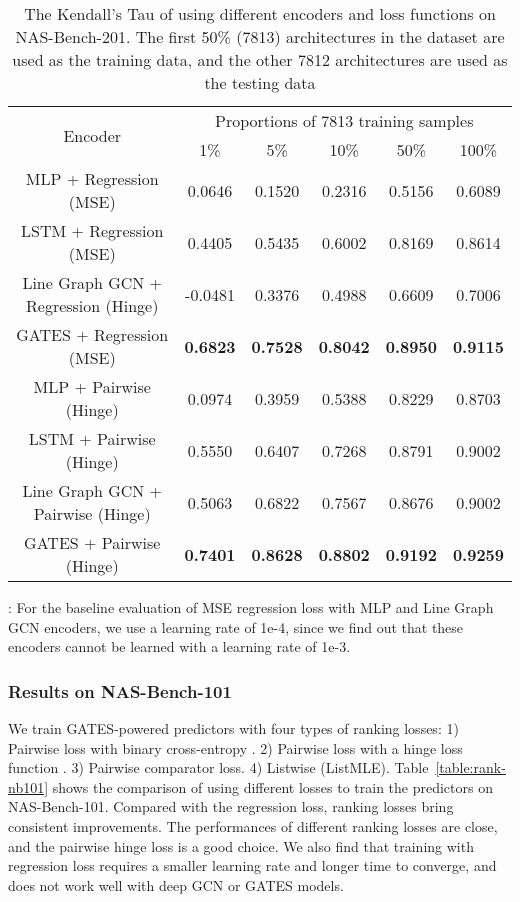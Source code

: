 \documentclass[runningheads]{llncs}
\begin{document}
\addtolength{\tabcolsep}{1pt}
\begin{table*}[tb]
\caption{The Kendall’s Tau of using different encoders and loss functions on NAS-Bench-201. The first 50\% (7813) architectures in the dataset are used as the training data, and the other 7812 architectures are used as the testing data}
\label{table:gates-nb201}
\begin{center}

\begin{tabular}{cccccc}
\toprule
\multirow{2}{*}{Encoder} & \multicolumn{5}{c}{Proportions of 7813 training samples}\\ 
\cmidrule(lr){2-6} & 1\% & 5\% & 10\% & 50\% & 100\% \\\midrule
MLP + Regression (MSE) & 0.0646 & 0.1520 & 0.2316 & 0.5156 & 0.6089  \\
  LSTM + Regression (MSE) & 0.4405 & 0.5435 & 0.6002 & 0.8169 & 0.8614\\
  Line Graph GCN + Regression (Hinge) &  -0.0481 &  0.3376 & 0.4988 & 0.6609 & 0.7006\\
GATES + Regression (MSE) & {\bf 0.6823} & {\bf 0.7528} & {\bf 0.8042} & {\bf 0.8950} & {\bf 0.9115}\\\hline
MLP + Pairwise (Hinge)  &  0.0974 & 0.3959 & 0.5388 & 0.8229 & 0.8703\\
  LSTM + Pairwise (Hinge) & 0.5550 & 0.6407 & 0.7268 & 0.8791 & 0.9002\\
  Line Graph GCN + Pairwise (Hinge) &   0.5063 & 0.6822 & 0.7567 & 0.8676 & 0.9002 \\ GATES + Pairwise (Hinge) & {\bf 0.7401} & {\bf 0.8628} & {\bf 0.8802} & {\bf 0.9192} & {\bf 0.9259}\\\bottomrule

\end{tabular}
\begin{minipage}{1.0\textwidth}
: For the baseline evaluation of MSE regression loss with MLP and Line Graph GCN encoders, we use a learning rate of 1e-4, since we find out that these encoders cannot be learned with a learning rate of 1e-3.
\end{minipage}
\end{center}
\end{table*}
\addtolength{\tabcolsep}{-1pt}

\subsubsection{Results on NAS-Bench-101}
We train GATES-powered predictors with four types of ranking losses: 1) Pairwise loss with binary cross-entropy . 2) Pairwise loss with a hinge loss function . 3) Pairwise comparator loss. 4) Listwise (ListMLE).
Table~\ref{table:rank-nb101} shows the comparison of using different losses to train the predictors on NAS-Bench-101. Compared with the regression loss, ranking losses bring consistent improvements.
The performances of different ranking losses are close, and the pairwise hinge loss is a good choice. We also find that training with regression loss requires a smaller learning rate and longer time to converge, and does not work well with 
deep GCN or GATES models.
\end{document}
